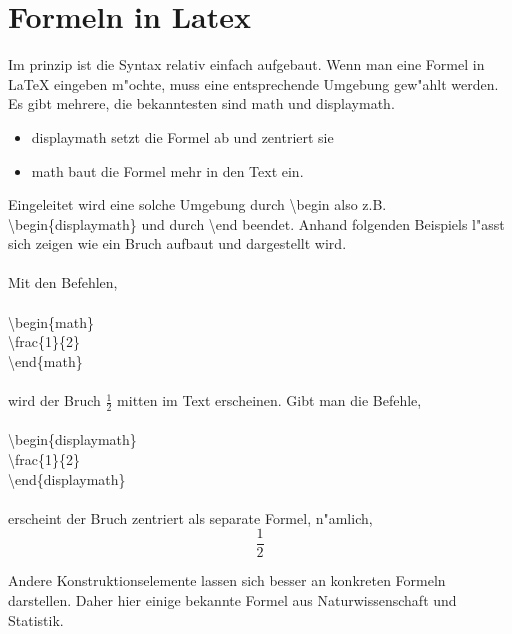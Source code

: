\chapter{Formeln in Latex}
\label{cha:formeln}


Im prinzip ist die Syntax relativ einfach aufgebaut. Wenn man eine Formel in LaTeX eingeben m"ochte, muss eine entsprechende Umgebung gew"ahlt werden. Es gibt mehrere, die bekanntesten sind math und displaymath. 
\begin{itemize}
\item displaymath setzt die Formel ab und zentriert sie 
\item math baut die Formel mehr in den Text ein.
\end{itemize}

Eingeleitet wird eine solche Umgebung durch {\textbackslash begin} also z.B. {\textbackslash begin\{displaymath\}} und durch {\textbackslash end} beendet. Anhand folgenden Beispiels  l"asst sich zeigen wie ein Bruch aufbaut und dargestellt wird. \\
\\
Mit den Befehlen,\\
\\
\textbackslash begin\{math\}\\
\textbackslash frac\{1\}\{2\}  \\
\textbackslash end\{math\}\\
\\
wird der Bruch 
\begin{math} 
\frac{1}{2} 
\end{math} 
mitten im Text erscheinen. Gibt man die Befehle,\\
\\
\textbackslash begin\{displaymath\}\\
\textbackslash frac\{1\}\{2\}  \\
\textbackslash end\{displaymath\}\\
\\
erscheint der Bruch zentriert als separate Formel, n"amlich,
\begin{displaymath} 
\frac{1}{2} 
\end{displaymath} 

Andere Konstruktionselemente lassen sich besser an konkreten Formeln darstellen. Daher hier einige bekannte Formel aus Naturwissenschaft und Statistik.
	
